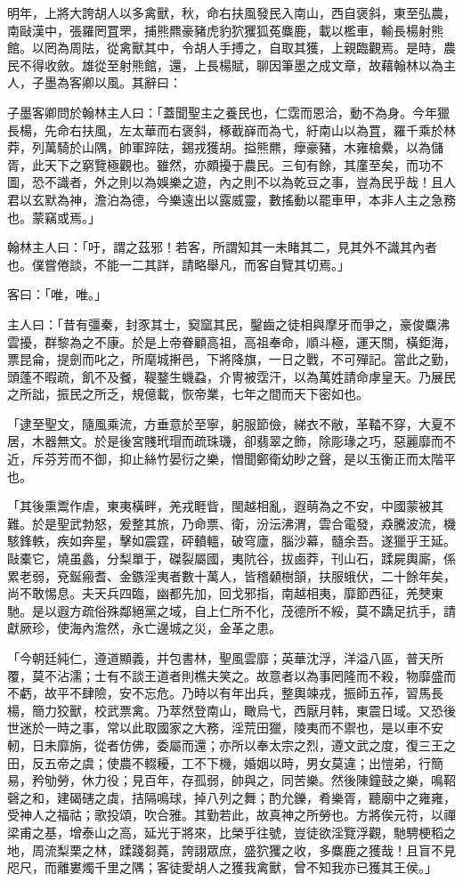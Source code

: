 \begin{pinyinscope}
明年，上將大誇胡人以多禽獸，秋，命右扶風發民入南山，西自褒斜，東至弘農，南敺漢中，張羅罔罝罘，捕熊羆豪豬虎豹狖玃狐菟麋鹿，載以檻車，輸長楊射熊館。以罔為周阹，從禽獸其中，令胡人手搏之，自取其獲，上親臨觀焉。是時，農民不得收斂。雄從至射熊館，還，上長楊賦，聊因筆墨之成文章，故藉翰林以為主人，子墨為客卿以風。其辭曰：

子墨客卿問於翰林主人曰：「蓋聞聖主之養民也，仁霑而恩洽，動不為身。今年獵長楊，先命右扶風，左太華而右褒斜，椓截嶭而為弋，紆南山以為罝，羅千乘於林莽，列萬騎於山隅，帥軍踤阹，錫戎獲胡。搤熊羆，癴豪豬，木雍槍纍，以為儲胥，此天下之窮覽極觀也。雖然，亦頗擾于農民。三旬有餘，其廑至矣，而功不圖，恐不識者，外之則以為娛樂之遊，內之則不以為乾豆之事，豈為民乎哉！且人君以玄默為神，澹泊為德，今樂遠出以露威靈，數搖動以罷車甲，本非人主之急務也。蒙竊或焉。」

翰林主人曰：「吁，謂之茲邪！若客，所謂知其一未睹其二，見其外不識其內者也。僕嘗倦談，不能一二其詳，請略舉凡，而客自覽其切焉。」

客曰：「唯，唯。」

主人曰：「昔有彊秦，封豕其士，窫窳其民，鑿齒之徒相與摩牙而爭之，豪俊麋沸雲擾，群黎為之不康。於是上帝眷顧高祖，高祖奉命，順斗極，運天關，橫鉅海，票昆侖，提劍而叱之，所麾城搟邑，下將降旗，一日之戰，不可殫記。當此之勤，頭蓬不暇疏，飢不及餐，鞮鍪生蟣蝨，介冑被霑汗，以為萬姓請命虖皇天。乃展民之所詘，振民之所乏，規億載，恢帝業，七年之間而天下密如也。

「逮至聖文，隨風乘流，方垂意於至寧，躬服節儉，綈衣不敝，革鞜不穿，大夏不居，木器無文。於是後宮賤玳瑁而疏珠璣，卻翡翠之飾，除彫瑑之巧，惡麗靡而不近，斥芬芳而不御，抑止絲竹晏衍之樂，憎聞鄭衛幼眇之聲，是以玉衡正而太階平也。

「其後熏鬻作虐，東夷橫畔，羌戎睚眥，閩越相亂，遐萌為之不安，中國蒙被其難。於是聖武勃怒，爰整其旅，乃命票、衛，汾沄沸渭，雲合電發，猋騰波流，機駭鋒軼，疾如奔星，擊如震霆，砰轒轀，破穹廬，腦沙幕，髓余吾。遂獵乎王延。敺橐它，燒虽蠡，分梨單于，磔裂屬國，夷阬谷，拔鹵莽，刊山石，蹂屍輿廝，係累老弱，兗鋋瘢耆、金鏃淫夷者數十萬人，皆稽顙樹頷，扶服蛾伏，二十餘年矣，尚不敢惕息。夫天兵四臨，幽都先加，回戈邪指，南越相夷，靡節西征，羌僰東馳。是以遐方疏俗殊鄰絕黨之域，自上仁所不化，茂德所不綏，莫不蹻足抗手，請獻厥珍，使海內澹然，永亡邊城之災，金革之患。

「今朝廷純仁，遵道顯義，并包書林，聖風雲靡；英華沈浮，洋溢八區，普天所覆，莫不沾濡；士有不談王道者則樵夫笑之。故意者以為事罔隆而不殺，物靡盛而不虧，故平不肆險，安不忘危。乃時以有年出兵，整輿竦戎，振師五莋，習馬長楊，簡力狡獸，校武票禽。乃萃然登南山，瞰烏弋，西厭月韩，東震日域。又恐後世迷於一時之事，常以此取國家之大務，淫荒田獵，陵夷而不禦也，是以車不安軔，日未靡旃，從者仿佛，委屬而還；亦所以奉太宗之烈，遵文武之度，復三王之田，反五帝之虞；使農不輟耰，工不下機，婚姻以時，男女莫違；出愷弟，行簡易，矜劬勞，休力役；見百年，存孤弱，帥與之，同苦樂。然後陳鐘鼓之樂，鳴鞀磬之和，建碣磍之虡，拮隔鳴球，掉八列之舞；酌允鑠，肴樂胥，聽廟中之雍雍，受神人之福祜；歌投頌，吹合雅。其勤若此，故真神之所勞也。方將俟元符，以禪梁甫之基，增泰山之高，延光于將來，比榮乎往號，豈徒欲淫覽浮觀，馳騁梗稻之地，周流梨栗之林，蹂踐芻蕘，誇詡眾庶，盛狖玃之收，多麋鹿之獲哉！且盲不見咫尺，而離婁燭千里之隅；客徒愛胡人之獲我禽獸，曾不知我亦已獲其王侯。」


\end{pinyinscope}
